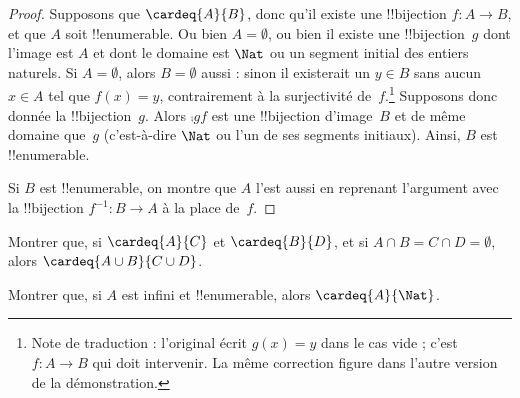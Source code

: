 \documentclass[11pt,a4paper,openany]{memoir}
\begin{document}
\begin{proof}
Supposons que $\cardeq{A}{B}$, donc qu'il existe une !!{bijection}
$f \colon A \to B$, et que $A$ soit !!{enumerable}.
{
  Ou bien $A = \emptyset$, ou bien il existe une !!{bijection}~$g$
  dont l'image est $A$ et dont le domaine est $\Nat$ ou un segment
  initial des entiers naturels. Si $A = \emptyset$, alors
  $B = \emptyset$ aussi : sinon il existerait un $y \in B$ sans
  aucun $x \in A$ tel que $f(x) = y$, contrairement à la
  surjectivité de~$f$.\footnote{Note de traduction : l'original
  écrit $g(x) = y$ dans le cas vide ; c'est $f\colon A \to B$
  qui doit intervenir. La même correction figure dans l'autre
  version de la démonstration.}
  Supposons donc donnée la !!{bijection}~$g$. Alors $\comp{g}{f}$
  est une !!{bijection} d'image~$B$ et de même domaine que~$g$
  (c'est-à-dire $\Nat$ ou l'un de ses segments initiaux).
  Ainsi, $B$ est !!{enumerable}.}

Si $B$ est !!{enumerable}, on montre que $A$ l'est aussi en
reprenant l'argument avec la !!{bijection} $f^{-1}\colon B \to A$
à la place de~$f$.
\end{proof}

\begin{prob}
Montrer que, si $\cardeq{A}{C}$ et $\cardeq{B}{D}$, et si
$A \cap B = C \cap D = \emptyset$, alors
$\cardeq{A \cup B}{C \cup D}$.
\end{prob}

\begin{prob}
Montrer que, si $A$ est infini et !!{enumerable}, alors
$\cardeq{A}{\Nat}$.
\end{prob}
\end{document}
